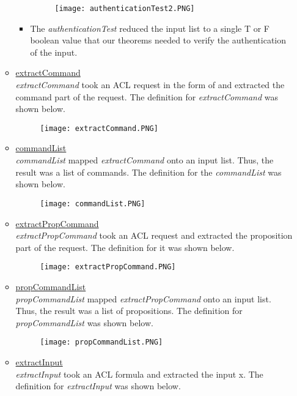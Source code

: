 \begin{itemize}
\begin{itemize}
\begin{itemize}
\begin{figure}[h]
  \centering
  \texttt{[image: authenticationTest2.PNG]}
\end{figure}
\item The \textit{authenticationTest} reduced the input list to a single T or F boolean value that our
  theorems needed to verify the authentication of the input.
\end{itemize}
\item \underline{extractCommand}\\
  \textit{extractCommand} took an ACL request in the form of and extracted the command part of the request.
  The definition for \textit{extractCommand} was shown below.
  \begin{figure}[h]
  \centering
  \texttt{[image: extractCommand.PNG]}
\end{figure}
\item \underline{commandList}\\
  \textit{commandList} mapped \textit{extractCommand} onto an input list.  Thus, the result was a list of
  commands.  The definition for the \textit{commandList} was shown below.
  \begin{figure}[h]
  \centering
  \texttt{[image: commandList.PNG]}
\end{figure}
\item \underline{extractPropCommand}\\
  \textit{extractPropCommand} took an ACL request and extracted the proposition part of the request.
  The definition for it was shown below.
  \begin{figure}[h]
  \centering
  \texttt{[image: extractPropCommand.PNG]}
\end{figure}
\item \underline{propCommandList}\\
  \textit{propCommandList} mapped \textit{extractPropCommand} onto an input list.  Thus, the result was a list of
  propositions.  The definition for \textit{propCommandList} was shown below.
  \begin{figure}[h]
  \centering
  \texttt{[image: propCommandList.PNG]}
\end{figure}
\item \underline{extractInput}\\
  \textit{extractInput} took an ACL formula and extracted the input x.   The definition for \textit{extractInput}
  was shown below.
  \begin{figure}[h]

\end{figure}
\end{itemize}
\end{itemize}
